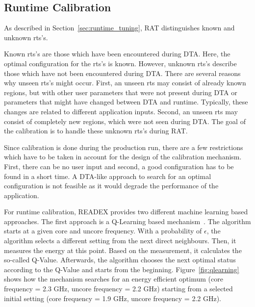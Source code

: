 \subsection{Runtime Calibration} \label{sec:calibration}

As described in Section~\ref{sec:runtime_tuning}, RAT distinguishes known and unknown rts's.

Known rts's are those which have been encountered during DTA.
Here, the optimal configuration for the rts's is known.
However, unknown rts's describe those which have not been encountered during DTA.
There are several reasons why unseen rts's might occur.
First, an unseen rts may consist of already known regions, but with other user parameters that were not present during DTA or parameters that might have changed between DTA and runtime.
Typically, these changes are related to different application inputs.
Second, an unseen rts may consist of completely new regions, which were not seen during DTA.
The goal of the calibration is to handle these unknown rts's during RAT.

Since calibration is done during the production run, there are a few restrictions which have to be taken in account for the design of the calibration mechanism.
First, there can be no user input and second, a good configuration has to be found in a short time.
A DTA-like approach to search for an optimal configuration is not feasible as it would degrade the performance of the application.

For runtime calibration, READEX provides two different machine learning based approaches.
The first approach is a Q-Learning based mechanism~\cite{Gocht2019a}.
The algorithm starts at a given core and uncore frequency.
With a probability of {$\epsilon$}, the algorithm selects a different setting from the next direct neighbours.
Then, it measures the energy at this point.
Based on the measurement, it calculates the so-called Q-Value.
Afterwards, the algorithm chooses the next optimal status according to the Q-Value and starts from the beginning.
Figure~\ref{fig:qlearning} shows how the mechanism searches for an energy efficient optimum (core frequency = 2.3 GHz, uncore frequency = 2.2 GHz) starting from a selected initial setting (core frequency = 1.9 GHz, uncore frequency = 2.2 GHz).

